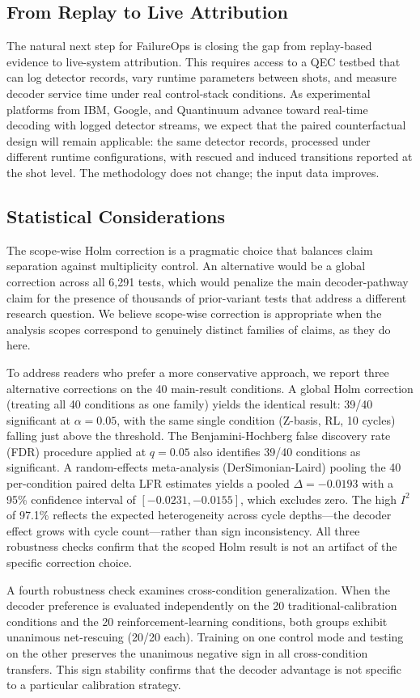 \subsection{From Replay to Live Attribution}

The natural next step for FailureOps is closing the gap from replay-based evidence to live-system attribution. This requires access to a QEC testbed that can log detector records, vary runtime parameters between shots, and measure decoder service time under real control-stack conditions. As experimental platforms from IBM, Google, and Quantinuum advance toward real-time decoding with logged detector streams, we expect that the paired counterfactual design will remain applicable: the same detector records, processed under different runtime configurations, with rescued and induced transitions reported at the shot level. The methodology does not change; the input data improves.

\subsection{Statistical Considerations}

The scope-wise Holm correction is a pragmatic choice that balances claim separation against multiplicity control. An alternative would be a global correction across all 6,291 tests, which would penalize the main decoder-pathway claim for the presence of thousands of prior-variant tests that address a different research question. We believe scope-wise correction is appropriate when the analysis scopes correspond to genuinely distinct families of claims, as they do here.

To address readers who prefer a more conservative approach, we report three alternative corrections on the 40 main-result conditions. A global Holm correction (treating all 40 conditions as one family) yields the identical result: 39/40 significant at $\alpha = 0.05$, with the same single condition (Z-basis, RL, 10 cycles) falling just above the threshold. The Benjamini-Hochberg false discovery rate (FDR) procedure applied at $q = 0.05$ also identifies 39/40 conditions as significant. A random-effects meta-analysis (DerSimonian-Laird) pooling the 40 per-condition paired delta LFR estimates yields a pooled $\Delta = -0.0193$ with a 95\% confidence interval of $[-0.0231, -0.0155]$, which excludes zero. The high $I^2$ of 97.1\% reflects the expected heterogeneity across cycle depths---the decoder effect grows with cycle count---rather than sign inconsistency. All three robustness checks confirm that the scoped Holm result is not an artifact of the specific correction choice.

A fourth robustness check examines cross-condition generalization. When the decoder preference is evaluated independently on the 20 traditional-calibration conditions and the 20 reinforcement-learning conditions, both groups exhibit unanimous net-rescuing (20/20 each). Training on one control mode and testing on the other preserves the unanimous negative sign in all cross-condition transfers. This sign stability confirms that the decoder advantage is not specific to a particular calibration strategy.
